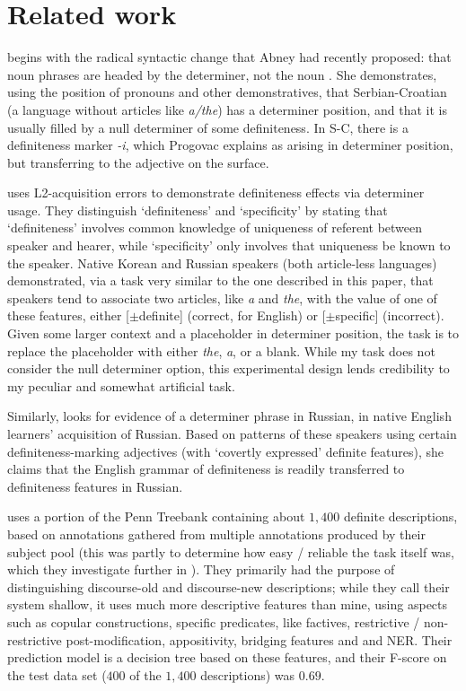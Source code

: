 \documentclass[11pt]{article}
\begin{document}
\section{Related work}

\citet{progovac:1995} begins with the radical syntactic change that Abney had recently proposed: that noun phrases are headed by the determiner, not the noun \citep{abney:1987}. She demonstrates, using the position of pronouns and other demonstratives, that Serbian-Croatian (a language without articles like \emph{a/the}) has a determiner position, and that it is usually filled by a null determiner of some definiteness. In S-C, there is a definiteness marker \emph{-i}, which Progovac explains as arising in determiner position, but transferring to the adjective on the surface.

\citet{ko:2009} uses L2-acquisition errors to demonstrate definiteness effects via determiner usage. They distinguish `definiteness' and `specificity' by stating that `definiteness' involves common knowledge of uniqueness of referent between speaker and hearer, while `specificity' only involves that uniqueness be known to the speaker. Native Korean and Russian speakers (both article-less languages) demonstrated, via a task very similar to the one described in this paper, that speakers tend to associate two articles, like \emph{a} and \emph{the}, with the value of one of these features, either [$\pm$definite] (correct, for English) or [$\pm$specific] (incorrect). Given some larger context and a placeholder in determiner position, the task is to replace the placeholder with either \emph{the}, \emph{a}, or a blank. While my task does not consider the null determiner option, this experimental design lends credibility to my peculiar and somewhat artificial task.

Similarly, \citet{cho:2011} looks for evidence of a determiner phrase in Russian, in native English learners' acquisition of Russian. Based on patterns of these speakers using certain definiteness-marking adjectives (with `covertly expressed' definite features), she claims that the English grammar of definiteness is readily transferred to definiteness features in Russian.

\citet{vieira:2000} uses a portion of the Penn Treebank containing about $1,400$ definite descriptions, based on annotations gathered from multiple annotations produced by their subject pool (this was partly to determine how easy / reliable the task itself was, which they investigate further in \citet{poesio:1998}). They primarily had the purpose of distinguishing discourse-old and discourse-new descriptions; while they call their system shallow, it uses much more descriptive features than mine, using aspects such as copular constructions, specific predicates, like factives, restrictive / non-restrictive post-modification, appositivity, bridging features and and NER. Their prediction model is a decision tree based on these features, and their F-score on the test data set ($400$ of the $1,400$ descriptions) was $0.69$.
\end{document}
